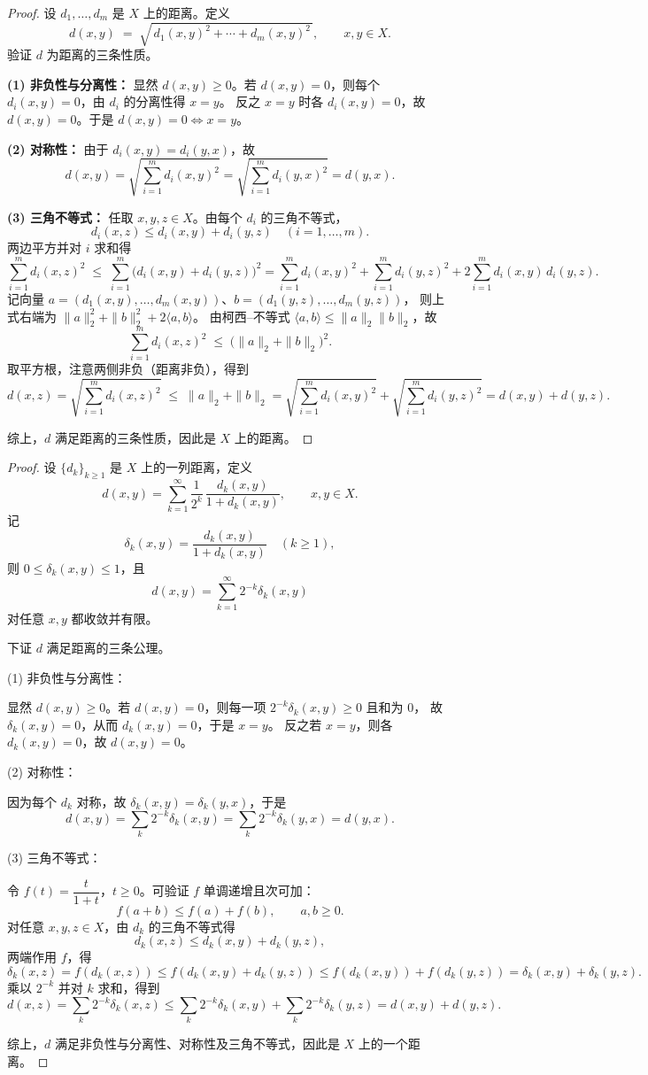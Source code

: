 \begin{proof}
设 $d_1,\dots,d_m$ 是 $X$ 上的距离。定义
\[
d(x,y)\;=\;\sqrt{\,d_1(x,y)^2+\cdots+d_m(x,y)^2\,},\qquad x,y\in X.
\]
验证 $d$ 为距离的三条性质。

\textbf{(1) 非负性与分离性：}
显然 $d(x,y)\ge0$。若 $d(x,y)=0$，则每个 $d_i(x,y)=0$，由 $d_i$ 的分离性得 $x=y$。
反之 $x=y$ 时各 $d_i(x,y)=0$，故 $d(x,y)=0$。于是 $d(x,y)=0\iff x=y$。

\textbf{(2) 对称性：}
由于 $d_i(x,y)=d_i(y,x)$，故
\[
d(x,y)=\sqrt{\sum_{i=1}^m d_i(x,y)^2}
=\sqrt{\sum_{i=1}^m d_i(y,x)^2}=d(y,x).
\]

\textbf{(3) 三角不等式：}
任取 $x,y,z\in X$。由每个 $d_i$ 的三角不等式，
\[
d_i(x,z)\le d_i(x,y)+d_i(y,z)\quad (i=1,\dots,m).
\]
两边平方并对 $i$ 求和得
\[
\sum_{i=1}^m d_i(x,z)^2
\;\le\;\sum_{i=1}^m\!\big(d_i(x,y)+d_i(y,z)\big)^2
=\sum_{i=1}^m d_i(x,y)^2+\sum_{i=1}^m d_i(y,z)^2
+2\sum_{i=1}^m d_i(x,y)\,d_i(y,z).
\]
记向量 $a=(d_1(x,y),\dots,d_m(x,y))$、$b=(d_1(y,z),\dots,d_m(y,z))$，
则上式右端为 $\|a\|_2^2+\|b\|_2^2+2\langle a,b\rangle$。
由柯西–不等式 $\langle a,b\rangle\le\|a\|_2\|b\|_2$，故
\[
\sum_{i=1}^m d_i(x,z)^2 \;\le\; \big(\|a\|_2+\|b\|_2\big)^2.
\]
取平方根，注意两侧非负（距离非负），得到
\[
d(x,z)=\sqrt{\sum_{i=1}^m d_i(x,z)^2}
\;\le\;\|a\|_2+\|b\|_2
=\sqrt{\sum_{i=1}^m d_i(x,y)^2}+\sqrt{\sum_{i=1}^m d_i(y,z)^2}
=d(x,y)+d(y,z).
\]

综上，$d$ 满足距离的三条性质，因此是 $X$ 上的距离。
\end{proof}
\begin{proof}
设 $\{d_k\}_{k\ge1}$ 是 $X$ 上的一列距离，定义
\[
d(x,y)=\sum_{k=1}^{\infty}\frac1{2^k}\,\frac{d_k(x,y)}{1+d_k(x,y)},\qquad x,y\in X.
\]
记
\[
\delta_k(x,y)=\frac{d_k(x,y)}{1+d_k(x,y)}\quad (k\ge1),
\]
则 $0\le \delta_k(x,y)\le 1$，且
\[
d(x,y)=\sum_{k=1}^\infty 2^{-k}\delta_k(x,y)
\]
对任意 $x,y$ 都收敛并有限。

下证 $d$ 满足距离的三条公理。

\medskip\noindent
(1) 非负性与分离性：

显然 $d(x,y)\ge0$。若 $d(x,y)=0$，则每一项 $2^{-k}\delta_k(x,y)\ge0$ 且和为 $0$，
故 $\delta_k(x,y)=0$，从而 $d_k(x,y)=0$，于是 $x=y$。
反之若 $x=y$，则各 $d_k(x,y)=0$，故 $d(x,y)=0$。

\medskip\noindent
(2) 对称性：

因为每个 $d_k$ 对称，故 $\delta_k(x,y)=\delta_k(y,x)$，于是
\[
d(x,y)=\sum_{k}2^{-k}\delta_k(x,y)
      =\sum_{k}2^{-k}\delta_k(y,x)
      =d(y,x).
\]

\medskip\noindent
(3) 三角不等式：

令 $f(t)=\dfrac{t}{1+t}$，$t\ge0$。可验证 $f$ 单调递增且次可加：
\[
f(a+b)\le f(a)+f(b),\qquad a,b\ge0.
\]
对任意 $x,y,z\in X$，由 $d_k$ 的三角不等式得
\[
d_k(x,z)\le d_k(x,y)+d_k(y,z),
\]
两端作用 $f$，得
\[
\delta_k(x,z)=f(d_k(x,z))
\le f(d_k(x,y)+d_k(y,z))
\le f(d_k(x,y))+f(d_k(y,z))
=\delta_k(x,y)+\delta_k(y,z).
\]
乘以 $2^{-k}$ 并对 $k$ 求和，得到
\[
d(x,z)=\sum_{k}2^{-k}\delta_k(x,z)
\le \sum_{k}2^{-k}\delta_k(x,y)+\sum_{k}2^{-k}\delta_k(y,z)
=d(x,y)+d(y,z).
\]

综上，$d$ 满足非负性与分离性、对称性及三角不等式，因此是 $X$ 上的一个距离。
\end{proof}
